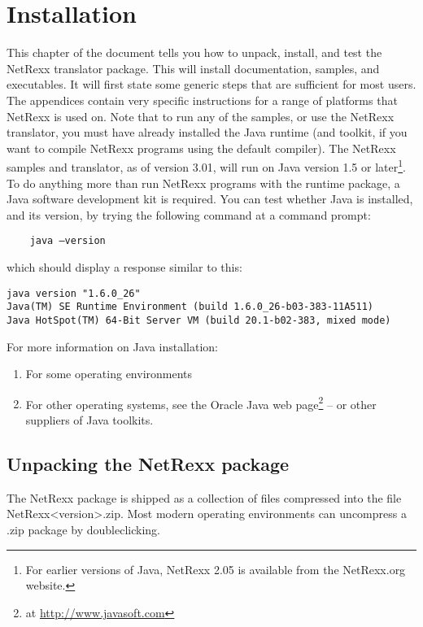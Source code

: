 \chapter{Installation}
This chapter of the document tells you how to unpack, install, and test the NetRexx translator package. This will install documentation, samples, and executables. It will first state some generic steps that are sufficient for most users. The appendices contain very specific instructions for a range of platforms that NetRexx is used on. 
Note that to run any of the samples, or use the NetRexx translator, you must have already installed the Java runtime (and toolkit, if you want to compile NetRexx programs using the default compiler). 
The NetRexx samples and translator, as of version 3.01, will run on 
Java version 1.5 or later\footnote{For earlier versions of Java, NetRexx 2.05 is available from the NetRexx.org website.}. To do anything more than run NetRexx programs with the runtime package, a Java software development kit is required. You can test whether Java is installed, and its version, by trying the following command at a command prompt:
\begin{verbatim} 
    java –version
\end{verbatim}
which should display a response similar to this:
\small
\begin{verbatim} 
java version "1.6.0_26"
Java(TM) SE Runtime Environment (build 1.6.0_26-b03-383-11A511)
Java HotSpot(TM) 64-Bit Server VM (build 20.1-b02-383, mixed mode)
\end{verbatim}
\large
For more information on Java installation:
\begin{enumerate} 
\item For some operating environments
\item For other operating systems, see the Oracle Java web page\footnote{at \url{http://www.javasoft.com}} – or other suppliers of Java toolkits.
\end{enumerate}
\section{Unpacking the NetRexx package}
The NetRexx package is shipped as a collection of files compressed into the file NetRexx<version>.zip. 
Most modern operating environments can uncompress a .zip package by doubleclicking.
